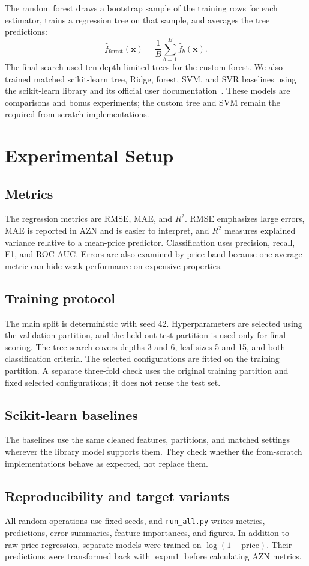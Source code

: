 \documentclass[10pt,twocolumn,a4paper]{article}
\begin{document}
The random forest draws a bootstrap sample of the training rows for each
estimator, trains a regression tree on that sample, and averages the tree
predictions:
\[
 \hat{f}_{\mathrm{forest}}(\mathbf{x})
 =\frac{1}{B}\sum_{b=1}^{B}\hat{f}_b(\mathbf{x}).
\]
The final search used ten depth-limited trees for the custom forest. We also
trained matched scikit-learn tree, Ridge, forest, SVM, and SVR baselines
using the scikit-learn library and its official user documentation~\cite{skdocs}.
These models are comparisons and bonus experiments; the custom tree and SVM
remain the required from-scratch implementations.

\section{Experimental Setup}
\subsection{Metrics}
The regression metrics are RMSE, MAE, and $R^2$. RMSE emphasizes large
errors, MAE is reported in AZN and is easier to interpret, and $R^2$
measures explained variance relative to a mean-price predictor.
Classification uses precision, recall, F1, and ROC-AUC. Errors are also
examined by price band because one average metric can hide weak performance
on expensive properties.

\subsection{Training protocol}
The main split is deterministic with seed 42. Hyperparameters are selected
using the validation partition, and the held-out test partition is used
only for final scoring. The tree search covers depths 3 and 6, leaf sizes
5 and 15, and both classification criteria. The selected configurations
are fitted on the training partition. A separate three-fold check uses the
original training partition and fixed selected configurations; it does not
reuse the test set.

\subsection{Scikit-learn baselines}
The baselines use the same cleaned features, partitions, and matched
settings wherever the library model supports them. They check whether the
from-scratch implementations behave as expected, not replace them.

\subsection{Reproducibility and target variants}
All random operations use fixed seeds, and \texttt{run\_all.py} writes
metrics, predictions, error summaries, feature importances, and figures.
In addition to raw-price regression, separate models were trained on
$\log(1+\text{price})$. Their predictions were transformed back with
$\operatorname{expm1}$ before calculating AZN metrics.
\end{document}
